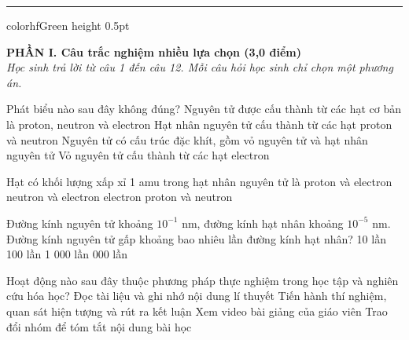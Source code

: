 \documentclass[11pt,a4paper]{article}
\begin{document}
\vspace{4pt}
\hrule color{hfGreen} height 0.5pt

\vspace{4pt}
\noindent
{\color{mainGreen}\textbf{\large PHẦN I. Câu trắc nghiệm nhiều lựa chọn (3,0 điểm)}}\\
\textit{\small Học sinh trả lời từ câu 1 đến câu 12. Mỗi câu hỏi học sinh chỉ chọn một phương án.}
\vspace{2pt}

\begin{ex}
Phát biểu nào sau đây không đúng?
\choice
{Nguyên tử được cấu thành từ các hạt cơ bản là proton, neutron và electron}
{Hạt nhân nguyên tử cấu thành từ các hạt proton và neutron}
{\True Nguyên tử có cấu trúc đặc khít, gồm vỏ nguyên tử và hạt nhân nguyên tử}
{Vỏ nguyên tử cấu thành từ các hạt electron}

\end{ex}
\begin{ex}
Hạt có khối lượng xấp xỉ 1 amu trong hạt nhân nguyên tử là
\choice
{proton và electron}
{neutron và electron}
{electron}
{\True proton và neutron}

\end{ex}
\begin{ex}
Đường kính nguyên tử khoảng $10^{-1}\text{ nm}$, đường kính hạt nhân khoảng $10^{-5}\text{ nm}$. Đường kính nguyên tử gấp khoảng bao nhiêu lần đường kính hạt nhân?
\choice
{10 lần}
{100 lần}
{1 000 lần}
{ 000 lần}

\end{ex}
\begin{ex}
Hoạt động nào sau đây thuộc phương pháp thực nghiệm trong học tập và nghiên cứu hóa học?
\choice
{Đọc tài liệu và ghi nhớ nội dung lí thuyết}
{\True Tiến hành thí nghiệm, quan sát hiện tượng và rút ra kết luận}
{Xem video bài giảng của giáo viên}
{Trao đổi nhóm để tóm tắt nội dung bài học}

\end{ex}
\end{document}
